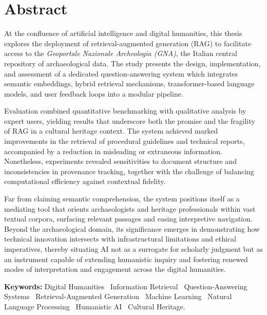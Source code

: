 \chapter{Abstract}
\label{chap:abstract}
\begin{spacing}{1.5}
At the confluence of artificial intelligence and digital humanities, this thesis explores the deployment of retrieval-augmented generation (RAG) to facilitate access to the \textit{Geoportale Nazionale Archeologia (GNA)}, the Italian central repository of archaeological data. The study presents the design, implementation, and assessment of a dedicated question-answering system which integrates semantic embeddings, hybrid retrieval mechanisms, transformer-based language models, and user feedback loops into a modular pipeline.

Evaluation combined quantitative benchmarking with qualitative analysis by expert users, yielding results that underscore both the promise and the fragility of RAG in a cultural heritage context. The system achieved marked improvements in the retrieval of procedural guidelines and technical reports, accompanied by a reduction in misleading or extraneous information. Nonetheless, experiments revealed sensitivities to document structure and inconsistencies in provenance tracking, together with the challenge of balancing computational efficiency against contextual fidelity.

Far from claiming semantic comprehension, the system positions itself as a mediating tool that orients archaeologists and heritage professionals within vast textual corpora, surfacing relevant passages and easing interpretive navigation. Beyond the archaeological domain, its significance emerges in demonstrating how technical innovation intersects with infrastructural limitations and ethical imperatives, thereby situating AI not as a surrogate for scholarly judgment but as an instrument capable of extending humanistic inquiry and fostering renewed modes of interpretation and engagement across the digital humanities.

\vspace{\baselineskip} %
\noindent\textbf{Keywords:} Digital Humanities \textperiodcentered\ Information Retrieval \textperiodcentered\ Question-Answering Systems \textperiodcentered\ Retrieval-Augmented Generation \textperiodcentered\ Machine Learning \textperiodcentered\ Natural Language Processing \textperiodcentered\ Humanistic AI \textperiodcentered\ Cultural Heritage.

\end{spacing}